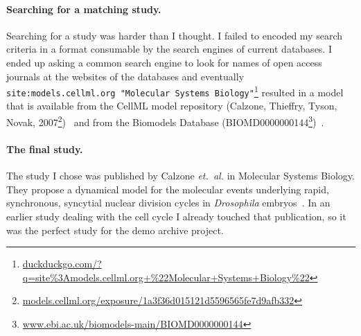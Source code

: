 \paragraph{Searching for a matching study.}
Searching for a study was harder than I thought.
I failed to encoded my search criteria in a format consumable by the search engines of current databases.
I ended up asking a common search engine to look for names of open access journals at the websites of the databases and eventually \texttt{site:models.cellml.org "Molecular Systems Biology"}\footnote{\href{https://duckduckgo.com/?q=site\%3Amodels.cellml.org+\%22Molecular+Systems+Biology\%22}{duckduckgo.com/?q=site\%3Amodels.cellml.org+\%22Molecular+Systems+Biology\%22}} resulted in a model that is available from the CellML model repository (Calzone, Thieffry, Tyson, Novak, 2007\footnote{\href{http://models.cellml.org/exposure/1a3f36d015121d5596565fe7d9afb332}{models.cellml.org/exposure/1a3f36d015121d5596565fe7d9afb332}})~\cite{cellmlrepo} and from the Biomodels Database (BIOMD0000000144\footnote{\href{http://www.ebi.ac.uk/biomodels-main/BIOMD0000000144}{www.ebi.ac.uk/biomodels-main/BIOMD0000000144}})~\cite{biomodels}.


\paragraph{The final study.}
The study I chose was published by Calzone \emph{et.~al.} in Molecular Systems Biology. They propose a dynamical model for the molecular events underlying rapid, synchronous, syncytial nuclear division cycles in \textit{Drosophila} embryos~\cite{Calzone2007}.
In an earlier study dealing with the cell cycle I already touched that publication, so it was the perfect study for the demo archive project.




